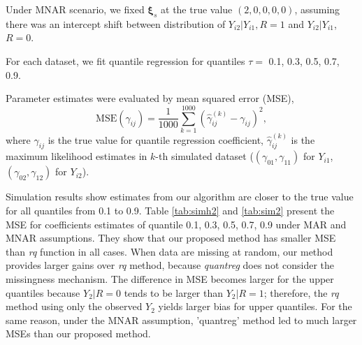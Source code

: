 \documentclass[12pt]{article}
\begin{document}
Under MNAR scenario, we fixed $\bm \xi_s$ at the true value $(2, 0, 0,
0, 0)$, assuming there was an intercept shift between distribution of
$Y_{i2}|Y_{i1}, R = 1$ and $Y_{i2}|Y_{i1}$, $R = 0$.

For each dataset, we fit quantile regression for quantiles $\tau =$
0.1, 0.3, 0.5, 0.7, 0.9.

Parameter estimates were evaluated by mean squared error (MSE),
\begin{equation*}
  \text{MSE} (\gamma_{ij}) = \frac{1}{1000} \sum_{k = 1}^{1000}
  \left( \hat{\gamma}_{ij}^{(k)}  - \gamma_{ij}\right)^2,
\end{equation*}
where $\gamma_{ij}$ is the true value for quantile regression
coefficient, $\hat{\gamma}_{ij}^{(k)}$ is the maximum likelihood
estimates in $k$-th simulated dataset ($(\gamma_{01}, \gamma_{11})$
for $Y_{i1}$, $(\gamma_{02}, \gamma_{12})$ for $Y_{i2}$).

Simulation results show estimates from our algorithm are closer to the
true value for all quantiles from 0.1 to 0.9. Table \ref{tab:simh2}
and \ref{tab:sim2} present the MSE for coefficients estimates of
quantile 0.1, 0.3, 0.5, 0.7, 0.9 under MAR and MNAR assumptions.  They
show that our proposed method has smaller MSE than \textit{rq}
function in all cases. When data are missing at random, our method
provides larger gains over \textit{rq} method, because
\textit{quantreg} does not consider the missingness mechanism. The
difference in MSE becomes larger for the upper quantiles because $Y_2
|R = 0$ tends to be larger than $Y_2 | R = 1$; therefore, the
\textit{rq} method using only the observed $Y_2$ yields larger bias
for upper quantiles.  For the same reason, under the MNAR assumption,
'quantreg' method led to much larger MSEs than our proposed method.
\end{document}
